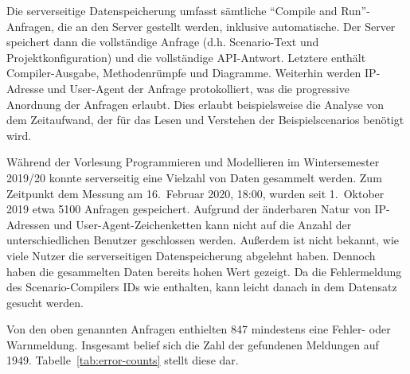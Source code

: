 Die serverseitige Datenspeicherung umfasst sämtliche ``Compile and Run''-Anfragen, die an den Server gestellt werden, inklusive automatische.
Der Server speichert dann die vollständige Anfrage (d.h. Scenario-Text und Projektkonfiguration) und die vollständige API-Antwort.
Letztere enthält Compiler-Ausgabe, Methodenrümpfe und Diagramme.
Weiterhin werden IP-Adresse und User-Agent der Anfrage protokolliert, was die progressive Anordnung der Anfragen erlaubt.
Dies erlaubt beispielsweise die Analyse von dem Zeitaufwand, der für das Lesen und Verstehen der Beispielscenarios benötigt wird.

Während der Vorlesung Programmieren und Modellieren im Wintersemester 2019/20 konnte serverseitig eine Vielzahl von Daten gesammelt werden.
Zum Zeitpunkt dem Messung am 16.\ Februar 2020, 18:00, wurden seit 1.\ Oktober 2019 etwa 5100 Anfragen gespeichert.
Aufgrund der änderbaren Natur von IP-Adressen und User-Agent-Zeichenketten kann nicht auf die Anzahl der unterschiedlichen Benutzer geschlossen werden.
Außerdem ist nicht bekannt, wie viele Nutzer die serverseitigen Datenspeicherung abgelehnt haben.
Dennoch haben die gesammelten Daten bereits hohen Wert gezeigt.
Da die Fehlermeldung des Scenario-Compilers IDs wie  enthalten, kann leicht danach in dem Datensatz gesucht werden.

Von den oben genannten Anfragen enthielten 847 mindestens eine Fehler- oder Warnmeldung.
Insgesamt belief sich die Zahl der gefundenen Meldungen auf 1949.
Tabelle~\ref{tab:error-counts} stellt diese dar.

